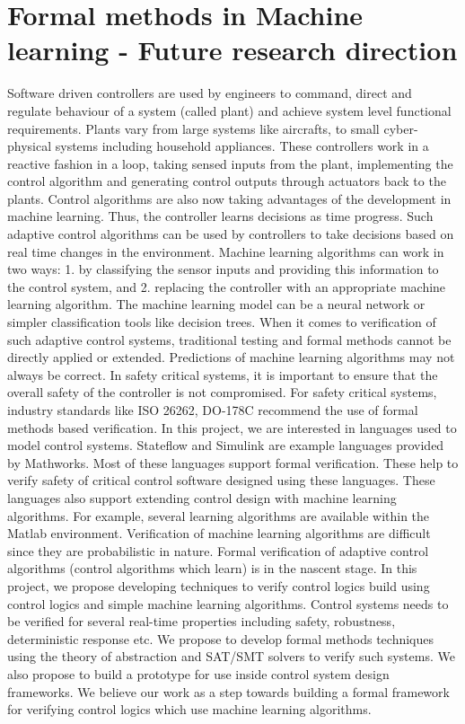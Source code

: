 \documentclass[a4paper,10pt]{article}
\theoremstyle{open}
\begin{document}
\section{Formal methods in Machine learning - Future research direction}
Software driven controllers are used by engineers to command, direct and regulate behaviour of a system
(called plant) and achieve system level functional requirements. Plants vary from large systems like aircrafts,
to small cyber-physical systems including household appliances. These controllers work in a reactive fashion
in a loop, taking sensed inputs from the plant, implementing the control algorithm and generating control
outputs through actuators back to the plants.
Control algorithms are also now taking advantages of the development in machine learning. Thus, the
controller learns decisions as time progress. Such adaptive control algorithms can be used by controllers to
take decisions based on real time changes in the environment. Machine learning algorithms can work in two
ways: 1. by classifying the sensor inputs and providing this information to the control system, and 2.
replacing the controller with an appropriate machine learning algorithm. The machine learning model can be
a neural network or simpler classification tools like decision trees.
When it comes to verification of such adaptive control systems, traditional testing and formal methods
cannot be directly applied or extended. Predictions of machine learning algorithms may not always be
correct. In safety critical systems, it is important to ensure that the overall safety of the controller is not
compromised. For safety critical systems, industry standards like ISO 26262, DO-178C recommend the use
of formal methods based verification.
In this project, we are interested in languages used to model control systems. Stateflow and Simulink are
example languages provided by Mathworks. Most of these languages support formal verification. These help
to verify safety of critical control software designed using these languages. These languages also support
extending control design with machine learning algorithms. For example, several learning algorithms are
available within the Matlab environment. Verification of machine learning algorithms are difficult since they
are probabilistic in nature. Formal verification of adaptive control algorithms (control algorithms which
learn) is in the nascent stage.
In this project, we propose developing techniques to verify control logics build using control logics and
simple machine learning algorithms. Control systems needs to be verified for several real-time properties
including safety, robustness, deterministic response etc. We propose to develop formal methods techniques
using the theory of abstraction and SAT/SMT solvers to verify such systems. We also propose to build a
prototype for use inside control system design frameworks. We believe our work as a step towards building a
formal framework for verifying control logics which use machine learning algorithms.
\end{document}

